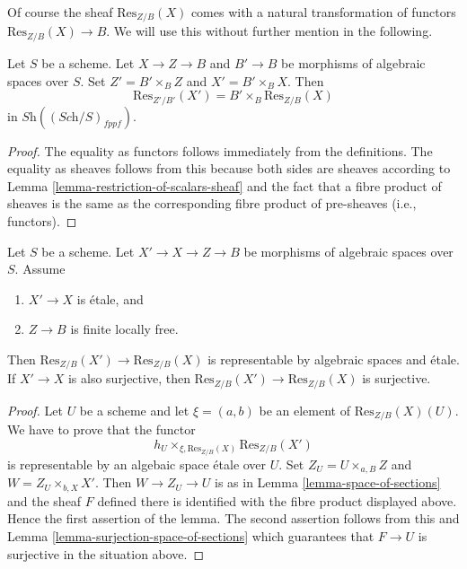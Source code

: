 \noindent
Of course the sheaf $\text{Res}_{Z/B}(X)$ comes with a natural transformation
of functors $\text{Res}_{Z/B}(X) \to B$. We will use this without further
mention in the following.

\begin{lemma}
\label{lemma-etale-base-change-restriction-of-scalars}
Let $S$ be a scheme. Let $X \to Z \to B$ and $B' \to B$
be morphisms of algebraic spaces over $S$.
Set $Z' = B' \times_B Z$ and $X' = B' \times_B X$. Then
$$
\text{Res}_{Z'/B'}(X')
=
B' \times_B \text{Res}_{Z/B}(X)
$$
in $\textit{Sh}((\textit{Sch}/S)_{fppf})$.
\end{lemma}

\begin{proof}
The equality as functors follows immediately from the definitions.
The equality as sheaves follows from this because both sides are
sheaves according to
Lemma \ref{lemma-restriction-of-scalars-sheaf}
and the fact that a fibre product of sheaves is the same as the
corresponding fibre product of pre-sheaves (i.e., functors).
\end{proof}

\begin{lemma}
\label{lemma-etale-covering-restriction-of-scalars}
Let $S$ be a scheme. Let $X' \to X \to Z \to B$ be morphisms of
algebraic spaces over $S$. Assume
\begin{enumerate}
\item $X' \to X$ is \'etale, and
\item $Z \to B$ is finite locally free.
\end{enumerate}
Then $\text{Res}_{Z/B}(X') \to \text{Res}_{Z/B}(X)$ is representable
by algebraic spaces and \'etale. If $X' \to X$ is also surjective,
then $\text{Res}_{Z/B}(X') \to \text{Res}_{Z/B}(X)$ is surjective.
\end{lemma}

\begin{proof}
Let $U$ be a scheme and let $\xi = (a, b)$ be an element of
$\text{Res}_{Z/B}(X)(U)$. We have to prove that the functor
$$
h_U \times_{\xi, \text{Res}_{Z/B}(X)} \text{Res}_{Z/B}(X')
$$
is representable by an algebaic space \'etale over $U$. Set
$Z_U = U \times_{a, B} Z$ and $W = Z_U \times_{b, X} X'$.
Then $W \to Z_U \to U$ is as in
Lemma \ref{lemma-space-of-sections}
and the sheaf $F$ defined there is identified with the fibre product
displayed above. Hence the first assertion of the lemma.
The second assertion follows from this and
Lemma \ref{lemma-surjection-space-of-sections}
which guarantees that $F \to U$ is surjective in the situation above.
\end{proof}

